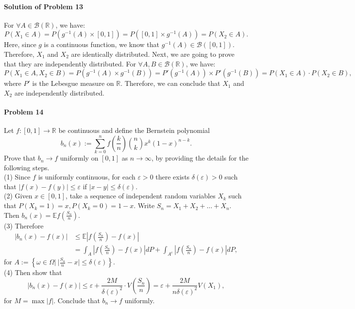 \documentclass{article}
\begin{document}
\paragraph{Solution of Problem 13} For $\forall A\in\mathcal B(\mathbb{R})$, we have:
\[P(X_1\in A) = P(g^{-1}(A)\times [0,1])= P([0,1]\times g^{-1}(A))=P(X_2\in A).\]
Here, since $g$ is a continuous function, we know that $g^{-1}(A)\in \mathcal B([0,1])$. Therefore, $X_1$ and $X_2$ are identically distributed. Next, we are going to prove that they are independently distributed. For $\forall A, B\in\mathcal B(\mathbb{R})$, we have:
\[P(X_1\in A, X_2\in B) = P(g^{-1}(A)\times g^{-1}(B))=P'(g^{-1}(A))\times P'(g^{-1}(B)) = P(X_1\in A)\cdot P(X_2\in B),\]
where $P'$ is the Lebesgue measure on $\mathbb{R}$. Therefore, we can conclude that $X_1$ and $X_2$ are independently distributed. 

\paragraph{Problem 14} Let $f:[0,1]\rightarrow\mathbb{R}$ be continuous and define the Bernstein polynomial 
\[b_n(x):=\sum_{k=0}^{n}f\left(\frac{k}{n}\right)\binom{n}{k}x^k(1-x)^{n-k}.\]
Prove that $b_n\rightarrow f$ uniformly on $[0,1]$ as $n\rightarrow\infty$, by providing the details for the following steps.\\
(1) Since $f$ is uniformly continuous, for each $\varepsilon > 0$ there exists $\delta(\varepsilon)>0$ such that $|f(x)-f(y)|\leqslant \varepsilon$ if $|x-y|\leqslant \delta(\varepsilon)$.\\
(2) Given $x\in[0,1]$, take a sequence of independent random variables $X_k$ such that $P(X_k=1)=x, P(X_k=0)=1-x$. Write $S_n=X_1+X_2+\ldots+X_n$. Then $b_n(x)=\mathbb{E}f\left(\frac{S_n}{n}\right)$.\\
(3) Therefore
\begin{equation*}
\begin{aligned}
|b_n(x)-f(x)|&\leqslant \mathbb{E}\left|f\left(\frac{S_n}{n}\right)-f(x)\right|\\
&= \int_A\left|f\left(\frac{S_n}{n}\right)-f(x)\right|dP + \int_{A^c}\left|f\left(\frac{S_n}{n}\right)-f(x)\right|dP,
\end{aligned}    
\end{equation*}
for $A:=\left\{\omega\in\Omega|~|\frac{S_n}{n}-x|\leqslant \delta(\varepsilon)\right\}$. \\
(4) Then show that
\[|b_n(x)-f(x)|\leqslant \varepsilon+\frac{2M}{\delta(\varepsilon)^2}\cdot V\left(\frac{S_n}{n}\right)=\varepsilon+\frac{2M}{n\delta(\varepsilon)^2}V(X_1),\]
for $M=\max|f|$. Conclude that $b_n\rightarrow f$ uniformly.
 
\end{document}
